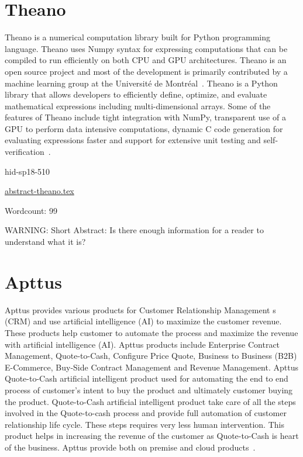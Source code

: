 \section{Theano}

Theano is a numerical computation library built for Python programming
language. Theano uses Numpy syntax for expressing computations that
can be compiled to run efficiently on both CPU and GPU
architectures. Theano is an open source project and most of the
development is primarily contributed by a machine learning group at
the Université de Montréal~\cite{hid-sp18-510-wiki-theano}. Theano is
a Python library that allows developers to efficiently define,
optimize, and evaluate mathematical expressions including
multi-dimensional arrays. Some of the features of Theano include tight
integration with NumPy, transparent use of a GPU to perform data
intensive computations, dynamic C code generation for evaluating
expressions faster and support for extensive unit testing and
self-verification~\cite{hid-sp18-510-web-theano}.


\begin{IU}

hid-sp18-510

\href{https://github.com/cloudmesh-community/hid-sp18-510/blob/master//technology/abstract-theano.tex}{abstract-theano.tex}

 

Wordcount: 99

WARNING: Short Abstract: Is there enough information for a reader to understand what it is?

\end{IU}

\section{Apttus}

Apttus provides various products for Customer Relationship Management
s (CRM) and use artificial intelligence (AI) to maximize the customer
revenue. These products help customer to automate the process and
maximize the revenue with artificial intelligence (AI). Apttus
products include Enterprise Contract Management, Quote-to-Cash,
Configure Price Quote, Business to Business (B2B) E-Commerce, Buy-Side
Contract Management and Revenue Management. Apttus Quote-to-Cash
artificial intelligent product used for automating the end to end
process of customer's intent to buy the product and ultimately
customer buying the product. Quote-to-Cash artificial intelligent
product take care of all the steps involved in the Quote-to-cash
process and provide full automation of customer relationship life
cycle. These steps requires very less human intervention. This product
helps in increasing the revenue of the customer as Quote-to-Cash is
heart of the business. Apttus provide both on premise and cloud
products~\cite{hid-sp18-511-apttus}.
 


